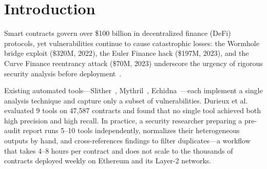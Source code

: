 \documentclass[conference]{IEEEtran}
\begin{document}
\section{Introduction}

Smart contracts govern over \$100 billion in decentralized finance (DeFi) protocols, yet vulnerabilities continue to cause catastrophic losses: the Wormhole bridge exploit (\$320M, 2022), the Euler Finance hack (\$197M, 2023), and the Curve Finance reentrancy attack (\$70M, 2023) underscore the urgency of rigorous security analysis before deployment~\cite{atzei2017survey}.

Existing automated tools---Slither~\cite{feist2019slither}, Mythril~\cite{mueller2018smashing}, Echidna~\cite{grieco2020echidna}---each implement a single analysis technique and capture only a subset of vulnerabilities. Durieux et al.~\cite{durieux2020empirical} evaluated 9 tools on 47,587 contracts and found that no single tool achieved both high precision and high recall. In practice, a security researcher preparing a pre-audit report runs 5--10 tools independently, normalizes their heterogeneous outputs by hand, and cross-references findings to filter duplicates---a workflow that takes 4--8 hours per contract and does not scale to the thousands of contracts deployed weekly on Ethereum and its Layer-2 networks.
\end{document}

